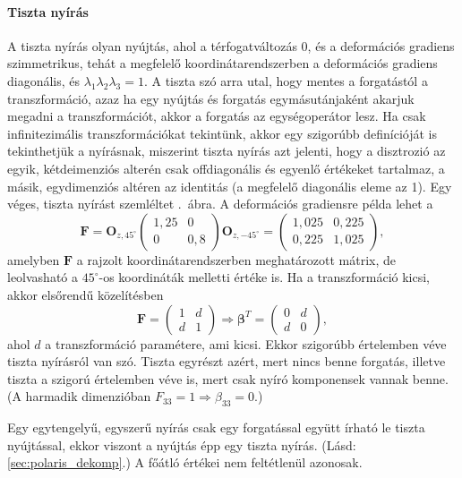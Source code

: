 \documentclass[12pt,a4paper]{scrartcl}
\let\mathbf\bm
\begin{document}
\paragraph{Tiszta nyírás} \label{sec:tiszta_nyiras}
A tiszta nyírás olyan nyújtás, ahol a térfogatváltozás 0, és a deformációs gradiens szimmetrikus, tehát a megfelelő koordinátarendszerben a deformációs gradiens diagonális, és ${\lambda _1}{\lambda _2}{\lambda _3} = 1$. A tiszta szó arra utal, hogy mentes a forgatástól a transzformáció, azaz ha egy nyújtás és forgatás egymásutánjaként akarjuk megadni a transzformációt, akkor a forgatás az egységoperátor lesz. Ha csak infinitezimális transzformációkat tekintünk, akkor egy szigorúbb definícióját is tekinthetjük a nyírásnak, miszerint tiszta nyírás azt jelenti, hogy a disztrozió az egyik, kétdeimenziós alterén csak offdiagonális és egyenlő értékeket tartalmaz, a másik, egydimenziós altéren az identitás (a megfelelő diagonális eleme az 1). Egy véges, tiszta nyírást szemléltet \az{\ref{fig:tiszta_nyiras}}.\ ábra. A deformációs gradiensre példa lehet a 
\[{\mathbf{F}} = {{\mathbf{O}}_{z,45^\circ }}\left( {\begin{array}{*{20}{c}}
  {1,25}&0 \\ 
  0&{0,8} 
\end{array}} \right){{\mathbf{O}}_{z, - 45^\circ }} = \left( {\begin{array}{*{20}{c}}
  {1,025}&{0,225} \\ 
  {0,225}&{1,025} 
\end{array}} \right),\]
amelyben ${\mathbf{F}}$ a rajzolt koordinátarendszerben meghatározott mátrix, de leolvasható a $45^\circ$-os koordináták melletti értéke is. Ha a transzformáció kicsi, akkor elsőrendű közelítésben
\[{\mathbf{F}} = \left( {\begin{array}{*{20}{c}}
  1&d \\ 
  d&1 
\end{array}} \right) \Rightarrow {{\mathbf{\beta }}^T} = \left( {\begin{array}{*{20}{c}}
  0&d \\ 
  d&0 
\end{array}} \right),\]
ahol $d$ a transzformáció paramétere, ami kicsi. Ekkor szigorúbb értelemben véve tiszta nyírásról van szó. Tiszta egyrészt azért, mert nincs benne forgatás, illetve tiszta a szigorú értelemben véve is, mert csak nyíró komponensek vannak benne. (A harmadik dimenzióban ${F_{33}} = 1 \Rightarrow {\beta _{33}} = 0$.)

Egy egytengelyű, egyszerű nyírás csak egy forgatással együtt írható le tiszta nyújtással, ekkor viszont a nyújtás épp egy tiszta nyírás. (Lásd: \ref{sec:polaris_dekomp}.) A főátló értékei nem feltétlenül azonosak.
\end{document}
